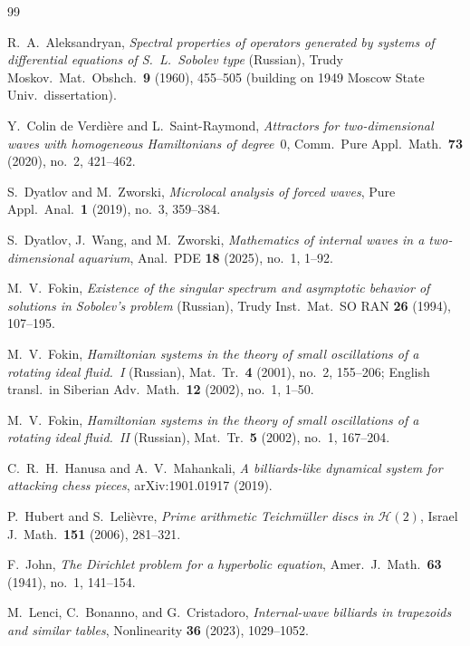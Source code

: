 \documentclass[11pt,reqno]{amsart}
\theoremstyle{definition}
\theoremstyle{remark}
\begin{document}
\begin{thebibliography}{99}

R.~A.~Aleksandryan,
\emph{Spectral properties of operators generated by systems of differential equations of S.~L.~Sobolev type} (Russian),
Trudy Moskov.\ Mat.\ Obshch.\ \textbf{9} (1960), 455--505 (building on 1949 Moscow State Univ.\ dissertation).

Y.~Colin de Verdi\`ere and L.~Saint-Raymond,
\emph{Attractors for two-dimensional waves with homogeneous Hamiltonians of degree~$0$},
Comm.\ Pure Appl.\ Math.\ \textbf{73} (2020), no.~2, 421--462.

S.~Dyatlov and M.~Zworski,
\emph{Microlocal analysis of forced waves},
Pure Appl.\ Anal.\ \textbf{1} (2019), no.~3, 359--384.

S.~Dyatlov, J.~Wang, and M.~Zworski,
\emph{Mathematics of internal waves in a two-dimensional aquarium},
Anal.\ PDE \textbf{18} (2025), no.~1, 1--92.

M.~V.~Fokin,
\emph{Existence of the singular spectrum and asymptotic behavior of solutions in Sobolev's problem} (Russian),
Trudy Inst.\ Mat.\ SO RAN \textbf{26} (1994), 107--195.

M.~V.~Fokin,
\emph{Hamiltonian systems in the theory of small oscillations of a rotating ideal fluid.~I} (Russian),
Mat.\ Tr.\ \textbf{4} (2001), no.~2, 155--206; English transl.\ in Siberian Adv.\ Math.\ \textbf{12} (2002), no.~1, 1--50.

M.~V.~Fokin,
\emph{Hamiltonian systems in the theory of small oscillations of a rotating ideal fluid.~II} (Russian),
Mat.\ Tr.\ \textbf{5} (2002), no.~1, 167--204.

C.~R.~H.~Hanusa and A.~V.~Mahankali,
\emph{A billiards-like dynamical system for attacking chess pieces},
arXiv:1901.01917 (2019).

P.~Hubert and S.~Leli\`evre,
\emph{Prime arithmetic Teichm\"uller discs in $\mathcal{H}(2)$},
Israel J.\ Math.\ \textbf{151} (2006), 281--321.

F.~John,
\emph{The Dirichlet problem for a hyperbolic equation},
Amer.\ J.\ Math.\ \textbf{63} (1941), no.~1, 141--154.

M.~Lenci, C.~Bonanno, and G.~Cristadoro,
\emph{Internal-wave billiards in trapezoids and similar tables},
Nonlinearity \textbf{36} (2023), 1029--1052.


\end{thebibliography}
\end{document}

